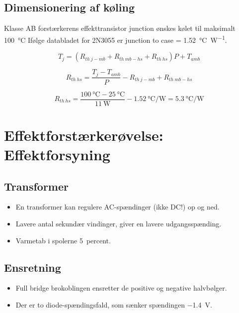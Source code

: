 \documentclass[danish]{article}
\begin{document}
\subsection{Dimensionering af køling}
Klasse AB forstærkerens effekttransistor junction ønskes kølet til maksimalt \SI{100}{\degreeCelsius}
Ifølge databladet for 2N3055 er junction to case = \SI{1.52}{\degreeCelsius\per\watt}.

\begin{equation}
T_j = (R_{th\:j-mb} + R_{th\: mb-hs} + R_{th\: hs})P + T_{amb}
\end{equation}

\begin{equation}
R_{th\: hs} = \dfrac{T_j-T_{amb}}{P}-R_{th\:j-mb} + R_{th\: mb-hs}
\end{equation}

\begin{equation}
R_{th\: hs} = \dfrac{\SI{100}{\degreeCelsius}-\SI{25}{\degreeCelsius}}{\SI{11}{\watt}}-\SI{1.52}{\degreeCelsius\per\watt} = \SI{5.3}{\degreeCelsius\per\watt}
\end{equation}




\newpage
\section{Effektforstærkerøvelse: Effektforsyning}

\subsection{Transformer}
\begin{itemize}
	\item En transformer kan regulere AC-spændinger (ikke DC!) op og ned.
	\item Lavere antal sekundær vindinger, giver en lavere udgangsspænding.
	\item Varmetab i spolerne \approx \SI{5}{percent}.
\end{itemize}


\subsection{Ensretning}
\begin{itemize}
	\item Full bridge brokoblingen ensretter de positive og negative halvbølger.
	\item Der er to diode-spændingsfald, som sænker spændingen \approx \SI{-1.4}{\volt}.
\end{itemize}
\end{document}

